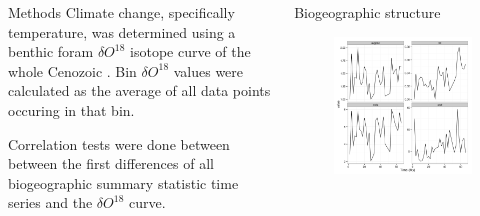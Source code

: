 \documentclass[final]{beamer}\usepackage[]{graphicx}\usepackage[]{color}
\newlength{\onecolwid}
\newlength{\twocolwid}
\begin{document}
\begin{frame}[t]
\begin{columns}[t]
\begin{column}{\onecolwid}
\begin{footnotesize}
\begin{block}{Methods}
        Climate change, specifically temperature, was determined using a benthic foram \(\delta O^{18}\) isotope curve of the whole Cenozoic \citep{Zachos2008}. Bin \(\delta O^{18}\) values were calculated as the average of all data points occuring in that bin.%

        Correlation tests were done between between the first differences of all biogeographic summary statistic time series and the \(\delta O^{18}\) curve. 

      \end{block}
      \end{footnotesize}

    \end{column}

    \begin{column}{\twocolwid}
      \begin{columns}[t,totalwidth = \twocolwid]
        \begin{column}{\onecolwid}
          \begin{block}{Biogeographic structure}
            \begin{figure}[ht]
              \begin{center}
                \includegraphics[height = 0.2\textheight]{figure/gen_bin}

\end{center}
\end{figure}
\end{block}
\end{column}
\end{columns}
\end{column}
\end{columns}
\end{frame}
\end{document}
